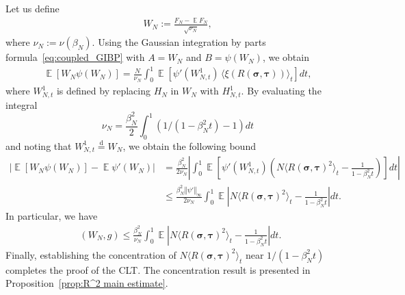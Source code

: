 \documentclass[letterpaper,11pt,reqno]{amsart}
\renewcommand{\leq}{\leqslant}
\newcommand{\ra}{\rangle}
\newcommand{\la}{\langle}
\newcommand{\norm}[1]{\left\Vert#1\right\Vert}
\newcommand{\abs}[1]{\left\vert#1\right\vert}
\newcommand{\equald}{\stackrel{\mathrm{d}}{=}}
\newcommand{\mvgs}{\boldsymbol{\sigma}}\newcommand{\mvgS}{\boldsymbol{\Sigma}}\newcommand{\mvgt}{\boldsymbol{\tau}}
\DeclareMathOperator{\E}{\mathds{E}}
\DeclareMathOperator{\dtv}{d_{TV}}
\begin{document}
Let us define
\begin{align*}W_N := \frac{F_N - \E F_N}{\sqrt{\nu_N}},\end{align*}
where \(\nu_N := \nu(\beta_N)\).
Using the Gaussian integration by parts formula~\eqref{eq:coupled_GIBP} with $A = W_N$ and $B = \psi(W_N)$, we obtain
\begin{align*}
    \E [W_N \psi (W_N)]
    = \frac{N}{\nu_N} \int_0^1 \E \left[ \psi'(W_{N,t}^1) \, \la \xi(R(\mvgs, \mvgt)) \ra_t \right] dt,
\end{align*}
where \(W^1_{N,t}\) is defined by replacing \(H_N\) in \(W_N\) with \(H^1_{N,t}\).
By evaluating the integral 
\[
\nu_N = \frac{\beta_N^2}{2} \int_0^1 (1/(1-\beta_N^2 t) - 1) dt 
\]
and noting that $W_{N,t}^1\equald W_N$, we obtain the following bound 
\begin{align*}
    \abs{\E [W_N \psi (W_N)] - \E \psi'(W_N)}
    &= \frac{\beta_N^2}{2\nu_N} \abs{ \int_0^1  \E \left[ \psi'(W^1_{N,t}) \left( N\la R(\mvgs, \mvgt)^2 \ra_t - \frac{1}{1-\beta_N^2 t}\right) \right] dt } \nonumber \\
    &\leq \frac{\beta_N^2 \norm{\psi'}_{\infty}}{2\nu_N} \int_0^1  \E \abs{ N\la R(\mvgs, \mvgt)^2 \ra_t - \frac{1}{1-\beta_N^2 t}} dt.
\end{align*}
In particular, we have
\begin{align}\label{eq:stein estimate}
\dtv(W_{N},g) \leq \frac{\beta_N^2}{\nu_N} \int_0^1  \E \abs{ N\la R(\mvgs, \mvgt)^2 \ra_t - \frac{1}{1-\beta_N^2 t}} dt.
\end{align}
Finally, establishing the concentration of $N \la R(\mvgs,\mvgt)^2 \ra_t$ near $1/(1-\beta_N^2t)$ completes the proof of the CLT. The concentration result is presented in Proposition~\ref{prop:R^2 main estimate}.
\end{document}
